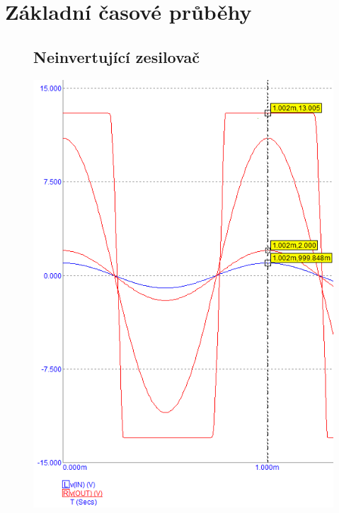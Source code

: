 \documentclass{article}
\begin{document}
\section*{Základní časové průběhy}
\begin{figure}[H]
  \begin{minipage}[t]{0.38\textwidth}
    \subsection*{Neinvertující zesilovač}
    \includegraphics[width=\textwidth]{PC/Tranzientni/nein.png}
  \end{minipage}
  \hfill
  \begin{minipage}[t]{0.32\textwidth}

\end{minipage}
\end{figure}
\end{document}
